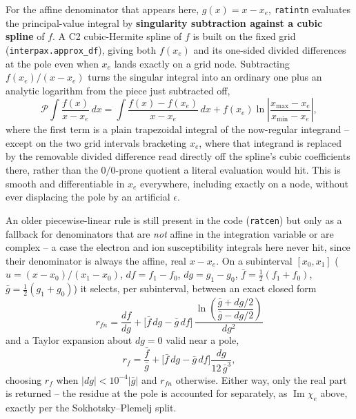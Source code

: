 \documentclass[11pt]{article}
\newcommand{\code}[1]{\texttt{#1}}
\begin{document}
For the affine denominator that appears here, $g(x)=x-x_e$, \code{ratintn} evaluates the
principal-value integral by \textbf{singularity subtraction against a cubic spline} of
$f$. A C2 cubic-Hermite spline of $f$ is built on the fixed grid (\code{interpax.approx\_df}),
giving both $f(x_e)$ and its one-sided divided differences at the pole even when $x_e$
lands exactly on a grid node. Subtracting $f(x_e)/(x-x_e)$ turns the singular integral into
an ordinary one plus an analytic logarithm from the piece just subtracted off,
\begin{equation}
  \mathcal P\!\int \frac{f(x)}{x-x_e}\,dx = \int \frac{f(x)-f(x_e)}{x-x_e}\,dx
  + f(x_e)\ln\!\left\vert\frac{x_{\max}-x_e}{x_{\min}-x_e}\right\vert,
\end{equation}
where the first term is a plain trapezoidal integral of the now-regular integrand -- except
on the two grid intervals bracketing $x_e$, where that integrand is replaced by the
removable divided difference read directly off the spline's cubic coefficients there,
rather than the $0/0$-prone quotient a literal evaluation would hit. This is smooth and
differentiable in $x_e$ everywhere, including exactly on a node, without ever displacing
the pole by an artificial $\epsilon$.

An older piecewise-linear rule is still present in the code (\code{ratcen}) but only as a
fallback for denominators that are \emph{not} affine in the integration variable or are
complex -- a case the electron and ion susceptibility integrals here never hit, since their
denominator is always the affine, real $x-x_e$. On a subinterval $[x_0,x_1]$
($u=(x-x_0)/(x_1-x_0)$, $df=f_1-f_0$, $dg=g_1-g_0$, $\bar f=\tfrac12(f_1+f_0)$,
$\bar g=\tfrac12(g_1+g_0)$) it selects, per subinterval, between an exact closed form
\begin{equation}
  r_{fn} = \frac{df}{dg}+\big[\bar f\,dg-\bar g\,df\big]\,
  \frac{\ln\!\left(\dfrac{\bar g+dg/2}{\bar g-dg/2}\right)}{dg^2}
\end{equation}
and a Taylor expansion about $dg=0$ valid near a pole,
\begin{equation}
  r_f = \frac{\bar f}{\bar g}+\big[\bar f\,dg-\bar g\,df\big]\frac{dg}{12\,\bar g^3},
\end{equation}
choosing $r_f$ when $\vert dg\vert<10^{-4}\vert\bar g\vert$ and $r_{fn}$ otherwise. Either
way, only the real part is returned -- the residue at the pole is accounted for
separately, as $\operatorname{Im}\chi_e$ above, exactly per the Sokhotsky--Plemelj split.
\end{document}
